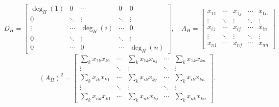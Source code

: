 \documentclass[10pt]{beamer}
\begin{document}
\begin{frame}
    \[
    D_H =
    \begin{bmatrix}
    \deg_H(1) & 0      & \cdots & 0 & 0      \\
    0         & \ddots & \vdots & \ddots & \vdots \\
    \vdots    & \cdots & \deg_H(i) & \cdots & 0      \\
    0         & \ddots & \vdots & \ddots & \vdots \\
    0         & \cdots & 0      & \cdots & \deg_H(n)
    \end{bmatrix}, \quad
    A_H =
    \begin{bmatrix}
    x_{11} & \cdots & x_{1j} & \cdots & x_{1n} \\
    \vdots  & \ddots  & \vdots & \ddots & \vdots  \\
    x_{i1} & \cdots & x_{ij} & \cdots & x_{in} \\
    \vdots  & \ddots  & \vdots & \ddots & \vdots  \\
    x_{n1} & \cdots & x_{nj} & \cdots & x_{nn}
    \end{bmatrix}
    \]
    \[
    (A_H)^2=
    \begin{bmatrix}
    \sum_k x_{1k}x_{k1}&\cdots&\sum_k x_{1k}x_{kj}&\cdots&\sum_k x_{1k}x_{kn}\\
    \vdots&\ddots&\vdots&\ddots&\vdots\\
    \sum_k x_{ik}x_{k1}&\cdots&\sum_k x_{ik}x_{kj}&\cdots&\sum_k x_{ik}x_{kn}\\
    \vdots&\ddots&\vdots&\ddots&\vdots\\
    \sum_k x_{nk}x_{k1}&\cdots&\sum_k x_{nk}x_{kj}&\cdots&\sum_k x_{nk}x_{kn}
    \end{bmatrix}.
    \]
\end{frame}
\end{document}
